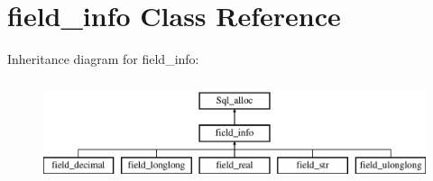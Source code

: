 \hypertarget{classfield__info}{}\section{field\+\_\+info Class Reference}
\label{classfield__info}
Inheritance diagram for field\+\_\+info\+:\begin{figure}[H]
\begin{center}
\leavevmode
\includegraphics[height=3.000000cm]{classfield__info}
\end{center}
\end{figure}
